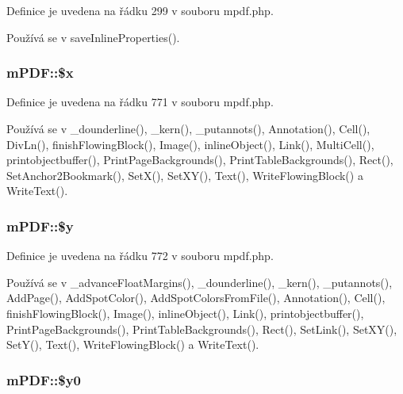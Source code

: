 Definice je uvedena na řádku 299 v souboru mpdf.\-php.



Používá se v save\-Inline\-Properties().

\hypertarget{classm_p_d_f_a36dec9628fe298cee82db1a3da362afe}{
\subsubsection[{\$x}]{\setlength{\rightskip}{0pt plus 5cm}m\-P\-D\-F\-::\$x}}\label{classm_p_d_f_a36dec9628fe298cee82db1a3da362afe}


Definice je uvedena na řádku 771 v souboru mpdf.\-php.



Používá se v \-\_\-dounderline(), \-\_\-kern(), \-\_\-putannots(), Annotation(), Cell(), Div\-Ln(), finish\-Flowing\-Block(), Image(), inline\-Object(), Link(), Multi\-Cell(), printobjectbuffer(), Print\-Page\-Backgrounds(), Print\-Table\-Backgrounds(), Rect(), Set\-Anchor2\-Bookmark(), Set\-X(), Set\-X\-Y(), Text(), Write\-Flowing\-Block() a Write\-Text().

\hypertarget{classm_p_d_f_a083c8994b04d6fd5cc7c8e59b46056b4}{
\subsubsection[{\$y}]{\setlength{\rightskip}{0pt plus 5cm}m\-P\-D\-F\-::\$y}}\label{classm_p_d_f_a083c8994b04d6fd5cc7c8e59b46056b4}


Definice je uvedena na řádku 772 v souboru mpdf.\-php.



Používá se v \-\_\-advance\-Float\-Margins(), \-\_\-dounderline(), \-\_\-kern(), \-\_\-putannots(), Add\-Page(), Add\-Spot\-Color(), Add\-Spot\-Colors\-From\-File(), Annotation(), Cell(), finish\-Flowing\-Block(), Image(), inline\-Object(), Link(), printobjectbuffer(), Print\-Page\-Backgrounds(), Print\-Table\-Backgrounds(), Rect(), Set\-Link(), Set\-X\-Y(), Set\-Y(), Text(), Write\-Flowing\-Block() a Write\-Text().

\hypertarget{classm_p_d_f_a9b0e63c94eee115fac7e8ec8f8016683}{
\subsubsection[{\$y0}]{\setlength{\rightskip}{0pt plus 5cm}m\-P\-D\-F\-::\$y0}}\label{classm_p_d_f_a9b0e63c94eee115fac7e8ec8f8016683}


